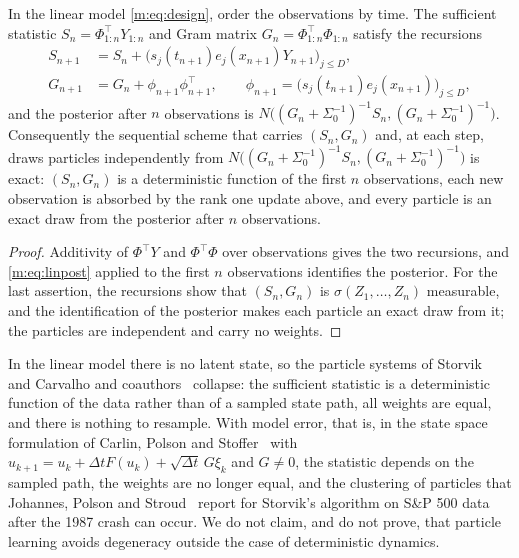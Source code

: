 \begin{proposition}\label{m:prop:storvik}
In the linear model \eqref{m:eq:design}, order the observations by time. The sufficient statistic $S_n=\Phi_{1:n}^\top Y_{1:n}$ and Gram matrix $G_n=\Phi_{1:n}^\top\Phi_{1:n}$ satisfy the recursions
\begin{align*}
S_{n+1}&=S_n+\big(s_j(t_{n+1})e_j(x_{n+1})Y_{n+1}\big)_{j\le D},\\
G_{n+1}&=G_n+\phi_{n+1}\phi_{n+1}^\top,\qquad\phi_{n+1}=\big(s_j(t_{n+1})e_j(x_{n+1})\big)_{j\le D},
\end{align*}
and the posterior after $n$ observations is $N\big((G_n+\Sigma_0^{-1})^{-1}S_n,(G_n+\Sigma_0^{-1})^{-1}\big)$. Consequently the sequential scheme that carries $(S_n,G_n)$ and, at each step, draws particles independently from $N\big((G_n+\Sigma_0^{-1})^{-1}S_n,(G_n+\Sigma_0^{-1})^{-1}\big)$ is exact: $(S_n,G_n)$ is a deterministic function of the first $n$ observations, each new observation is absorbed by the rank one update above, and every particle is an exact draw from the posterior after $n$ observations.
\end{proposition}

\begin{proof}
Additivity of $\Phi^\top Y$ and $\Phi^\top\Phi$ over observations gives the two recursions, and \eqref{m:eq:linpost} applied to the first $n$ observations identifies the posterior. For the last assertion, the recursions show that $(S_n,G_n)$ is $\sigma(Z_1,\dots,Z_n)$ measurable, and the identification of the posterior makes each particle an exact draw from it; the particles are independent and carry no weights.
\end{proof}

\begin{remark}\label{m:rem:degeneracy}
In the linear model there is no latent state, so the particle systems of Storvik~\cite{storvik2002} and Carvalho and coauthors~\cite{cjlp2010} collapse: the sufficient statistic is a deterministic function of the data rather than of a sampled state path, all weights are equal, and there is nothing to resample. With model error, that is, in the state space formulation of Carlin, Polson and Stoffer~\cite{cps1992} with $u_{k+1}=u_k+\Delta tF(u_k)+\sqrt{\Delta t}\,G\xi_k$ and $G\ne0$, the statistic depends on the sampled path, the weights are no longer equal, and the clustering of particles that Johannes, Polson and Stroud~\cite{jps2009} report for Storvik's algorithm on S\&P 500 data after the 1987 crash can occur. We do not claim, and do not prove, that particle learning avoids degeneracy outside the case of deterministic dynamics.
\end{remark}

